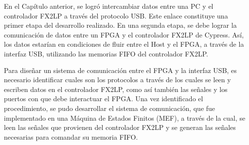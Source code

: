 En el Capítulo anterior, se logró intercambiar datos entre una PC y el controlador FX2LP a través del protocolo USB. Este enlace constituye una primer etapa del desarrollo realizado. En una segunda etapa, se debe lograr la comunicación de datos entre un FPGA y el controlador FX2LP de Cypress. Así, los datos estarían en condiciones de fluir entre el Host y el FPGA, a través de la interfaz USB, utilizando las memorias FIFO del controlador FX2LP. 

Para diseñar un sistema de comunicación entre el FPGA y la interfaz USB, es necesario identificar cuales son los protocolos a través de los cuales se leen y escriben datos en el controlador FX2LP, como así también las señales y los puertos con que debe interactuar el FPGA. Una vez identificado el procedimiento, se pudo desarrollar el sistema de comunicación, que fue implementado en una Máquina de Estados Finitos (MEF), a través de la cual, se leen las señales que provienen del controlador FX2LP y se generan las señales necesarias para comandar su memoria FIFO.


%	
%	

